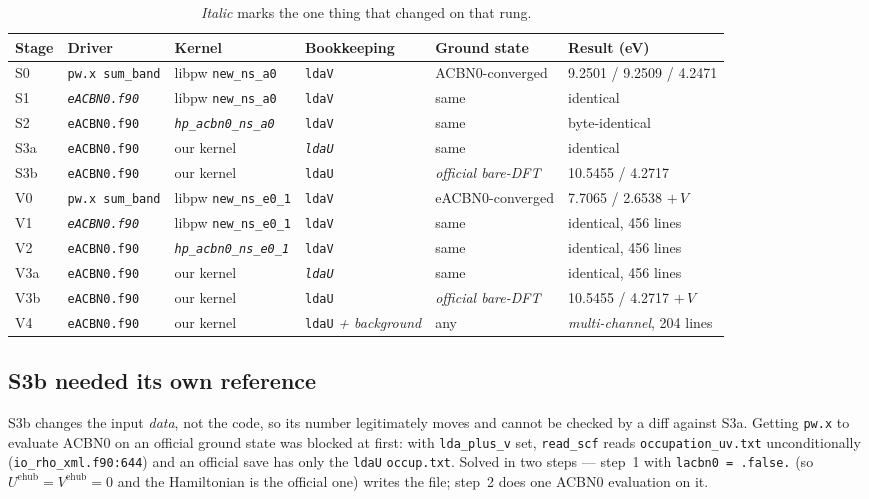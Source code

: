 \documentclass[11pt,a4paper]{article}
\newcommand{\C}[1]{\texttt{\small #1}}
\begin{document}
\begin{table}[h]
\centering\small
\setlength{\tabcolsep}{4.5pt}
\begin{tabular}{llllll}
\toprule
Stage & Driver & Kernel & Bookkeeping & Ground state & Result (eV) \\
\midrule
S0  & \C{pw.x sum_band} & libpw \C{new_ns_a0} & \C{ldaV} & ACBN0-converged & 9.2501 / 9.2509 / 4.2471 \\
S1  & \emph{\C{eACBN0.f90}} & libpw \C{new_ns_a0} & \C{ldaV} & same & identical \\
S2  & \C{eACBN0.f90} & \emph{\C{hp_acbn0_ns_a0}} & \C{ldaV} & same & byte-identical \\
S3a & \C{eACBN0.f90} & our kernel & \emph{\C{ldaU}} & same & identical \\
S3b & \C{eACBN0.f90} & our kernel & \C{ldaU} & \emph{official bare-DFT} & 10.5455 / 4.2717 \\
\midrule
V0  & \C{pw.x sum_band} & libpw \C{new_ns_e0_1} & \C{ldaV} & eACBN0-converged & 7.7065 / 2.6538 $+\,V$ \\
V1  & \emph{\C{eACBN0.f90}} & libpw \C{new_ns_e0_1} & \C{ldaV} & same & identical, 456 lines \\
V2  & \C{eACBN0.f90} & \emph{\C{hp_acbn0_ns_e0_1}} & \C{ldaV} & same & identical, 456 lines \\
V3a & \C{eACBN0.f90} & our kernel & \emph{\C{ldaU}} & same & identical, 456 lines \\
V3b & \C{eACBN0.f90} & our kernel & \C{ldaU} & \emph{official bare-DFT} & 10.5455 / 4.2717 $+\,V$ \\
V4  & \C{eACBN0.f90} & our kernel & \C{ldaU} \emph{+ background} & any & \emph{multi-channel}, 204 lines \\
\bottomrule
\end{tabular}
\caption{\emph{Italic} marks the one thing that changed on that rung.}
\end{table}

\subsection{S3b needed its own reference}

S3b changes the input \emph{data}, not the code, so its number legitimately
moves and cannot be checked by a diff against S3a. Getting \C{pw.x} to evaluate
ACBN0 on an official ground state was blocked at first: with \C{lda_plus_v} set,
\C{read_scf} reads \C{occupation_uv.txt} unconditionally
(\C{io_rho_xml.f90:644}) and an official save has only the \C{ldaU}
\C{occup.txt}. Solved in two steps --- step~1 with \C{lacbn0 = .false.} (so
$U^{\text{ehub}} = V^{\text{ehub}} = 0$ and the Hamiltonian is the official one)
writes the file; step~2 does one ACBN0 evaluation on it.
\end{document}
